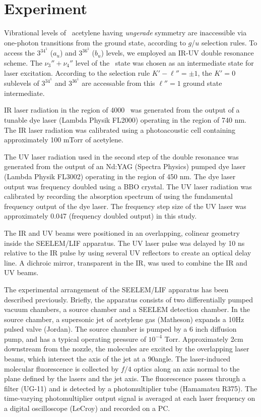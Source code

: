 \documentclass[12pt]{mitthesis}
\begin{document}
\section{Experiment}

Vibrational levels of \astate\ acetylene having \emph{ungerade}
symmetry are inaccessible via one-photon transitions from the ground
state, according to $g$/$u$ selection rules.  To access the $3^34^1$
($a_u$) and $3^36^1$ ($b_u$) levels, we employed an IR-UV double
resonance scheme.  The $\nu_3''+\nu_4''$ level of the \xstate\ state
was chosen as an intermediate state for laser excitation.  According
to the selection rule $K'-\ell'' = \pm 1$, the $K'=0$ sublevels of
$3^34^1$ and $3^36^1$ are accessable from this $\ell''=1$ ground state
intermediate.

IR laser radiation in the region of 4000 \rcm\ was generated from the
output of a tunable dye laser (Lambda Physik FL2000) operating in the
region of 740 nm.    The IR laser radiation was
calibrated using a photoacoustic cell containing approximately 100
mTorr of acetylene.

The UV laser radiation used in the second step of the double resonance
was generated from the output of an Nd:YAG (Spectra Physics) pumped
dye laser (Lambda Physik FL3002) operating in the region of 450 nm.
The dye laser output was frequency doubled using a BBO crystal.  The
UV laser radiation was calibrated by recording the absorption spectrum
of  using the fundamental frequency output of the dye laser.
The frequency step size of the UV laser was approximately 0.047 \rcm
(frequency doubled output) in this study.

The IR and UV beams were positioned in an overlapping, colinear
geometry inside the SEELEM/LIF apparatus.  The UV laser pulse was
delayed by 10 ns relative to the IR pulse by using several UV
reflectors to create an optical delay line.  A dichroic mirror,
transparent in the IR, was used to combine the IR and UV beams.

The experimental arrangement of the SEELEM/LIF apparatus has been
described previously.    Briefly, the apparatus consists
of two differentially pumped vacuum chambers, a source chamber and a
SEELEM detection chamber.  In the source chamber, a supersonic jet of
acetylene gas (Matheson) expands a 10Hz pulsed valve (Jordan).  The
source chamber is pumped by a 6 inch diffusion pump, and has a typical
operating pressure of $10^{-4}$ Torr.  Approximately 2cm downstream
from the nozzle, the molecules are excited by the overlapping laser
beams, which intersect the axis of the jet at a 90\degrees angle.  The
laser-induced molecular fluorescence is collected by $f/4$ optics
along an axis normal to the plane defined by the lasers and the jet
axis.  The fluorescence passes through a filter (UG-11) and is
detected by a photomultiplier tube (Hamamatsu R375).  The time-varying
photomultiplier output signal is averaged at each laser frequency on a
digital oscilloscope (LeCroy) and recorded on a PC.
\end{document}

